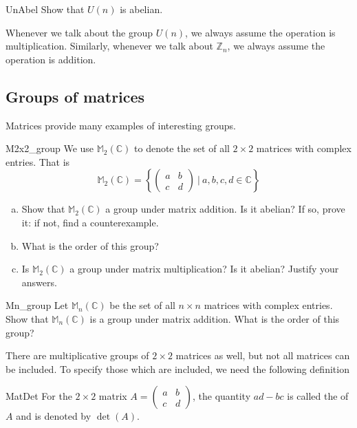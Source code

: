 \begin{exercise}{UnAbel}
Show that $U(n)$ is abelian.
\end{exercise}

\begin{rem}\label{UnMul}
Whenever we talk about the group $U(n)$, we always assume the operation is multiplication. Similarly, whenever we talk about ${\mathbb Z}_n$, we always assume the operation is addition.
\end{rem}

\subsection{Groups of matrices}
Matrices provide many examples of interesting groups.

\begin{exercise}{M2x2_group}
We use  ${\mathbb M}_2 ( {\mathbb C})$\label{notematrices} to denote the set of all $2 \times 2$ matrices with complex entries.  That is
\[
{\mathbb M}_2 ( {\mathbb C}) = \left\{ 
\begin{pmatrix}
a & b \\
c & d
\end{pmatrix} ~|~ a,b,c,d \in {\mathbb C} \right\} \]

\begin{enumerate}[(a)]
\item
Show that ${\mathbb M}_2 ( {\mathbb C})$ a group under matrix addition. Is it abelian? If so, prove it: if not, find a counterexample.
\item
What is the order of this group?
\item
Is ${\mathbb M}_2 ( {\mathbb C})$ a group under matrix multiplication? Is it abelian? Justify your answers.
\end{enumerate}
\end{exercise} 

\begin{exercise}{Mn_group}
Let  ${\mathbb M}_n ( {\mathbb C})$ \label{notematrices} be the set of all $n\times n$ matrices with complex entries.  Show that  ${\mathbb M}_n ( {\mathbb C})$ is a group under matrix addition. What is the order of this group?
\end{exercise}

There are multiplicative groups of $2 \times 2$ matrices as well, but not all matrices can be included. To specify those which are included, we need the following definition

\begin{defn}{MatDet}  
For the $2\times 2$ matrix  $A =
\begin{pmatrix}
a & b \\
c & d
\end{pmatrix}$, the quantity $ad-bc$ is called the  of $A$ and is denoted by $\det(A)$.
\end{defn}


